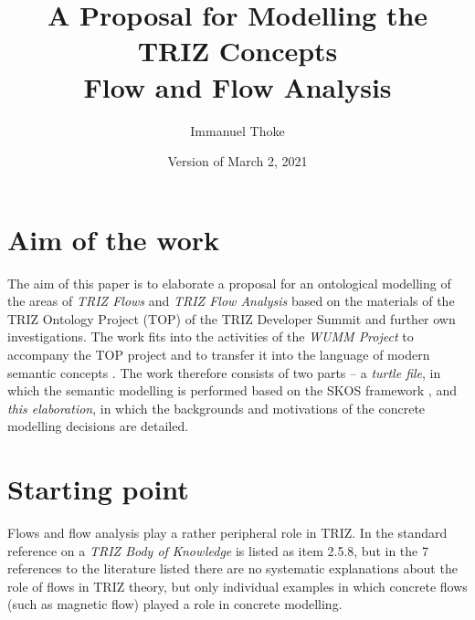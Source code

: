 \documentclass[11pt,a4paper]{article}
\title{A Proposal for Modelling the TRIZ Concepts\\ Flow and Flow Analysis}
\author{Immanuel Thoke}
\date{Version of March 2, 2021}
\begin{document}
\maketitle

\section{Aim of the work}

The aim of this paper is to elaborate a proposal for an ontological modelling
of the areas of \emph{TRIZ Flows} and \emph{TRIZ Flow Analysis} based on the
materials of the TRIZ Ontology Project (TOP) of the TRIZ Developer Summit
\cite{TOP} and further own investigations. The work fits into the activities
of the \emph{WUMM Project} \cite{WUMM} to accompany the TOP project and to
transfer it into the language of modern semantic concepts
\cite{WUMM-Ontology}.  The work therefore consists of two parts -- a
\emph{turtle file}, in which the semantic modelling is performed based on the
SKOS framework \cite{SKOS}, and \emph{this elaboration}, in which the
backgrounds and motivations of the concrete modelling decisions are detailed.

\section{Starting point} 

Flows and flow analysis play a rather peripheral role in TRIZ.  In the
standard reference \cite{Petrov2007} on a \emph{TRIZ Body of Knowledge} is
listed as item 2.5.8, but in the 7 references to the literature listed there
are no systematic explanations about the role of flows in TRIZ theory, but
only individual examples in which concrete flows (such as magnetic flow)
played a role in concrete modelling.  
\end{document}
